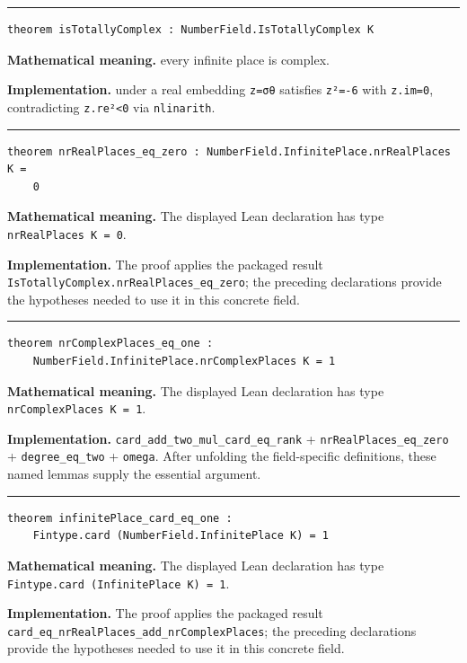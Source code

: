 \documentclass[UTF8,a4paper,11pt,fontset=fandol]{ctexart}
\theoremstyle{definition}
\newcommand{\statementsep}{\par\medskip\hrule\medskip}
\begin{document}
\statementsep
\begin{verbatim}
theorem isTotallyComplex : NumberField.IsTotallyComplex K
\end{verbatim}
\noindent\textbf{Mathematical meaning.} every infinite place is complex.\par
\noindent\textbf{Implementation.} under a real embedding \texttt{z=σθ} satisfies \texttt{z²=-6} with \texttt{z.\allowbreak{}im=0}, contradicting \texttt{z.\allowbreak{}re²<0} via \texttt{nlinarith}.\par
\statementsep
\begin{verbatim}
theorem nrRealPlaces_eq_zero : NumberField.InfinitePlace.nrRealPlaces K =
    0
\end{verbatim}
\noindent\textbf{Mathematical meaning.} The displayed Lean declaration has type \texttt{nrRealPlaces K = 0}.\par
\noindent\textbf{Implementation.} The proof applies the packaged result \texttt{IsTotallyComplex.\allowbreak{}nrRealPlaces\_\allowbreak{}eq\_\allowbreak{}zero}; the preceding declarations provide the hypotheses needed to use it in this concrete field.\par
\statementsep
\begin{verbatim}
theorem nrComplexPlaces_eq_one :
    NumberField.InfinitePlace.nrComplexPlaces K = 1
\end{verbatim}
\noindent\textbf{Mathematical meaning.} The displayed Lean declaration has type \texttt{nrComplexPlaces K = 1}.\par
\noindent\textbf{Implementation.} \texttt{card\_\allowbreak{}add\_\allowbreak{}two\_\allowbreak{}mul\_\allowbreak{}card\_\allowbreak{}eq\_\allowbreak{}rank} + \texttt{nrRealPlaces\_\allowbreak{}eq\_\allowbreak{}zero} + \texttt{degree\_\allowbreak{}eq\_\allowbreak{}two} + \texttt{omega}. After unfolding the field-specific definitions, these named lemmas supply the essential argument.\par
\statementsep
\begin{verbatim}
theorem infinitePlace_card_eq_one :
    Fintype.card (NumberField.InfinitePlace K) = 1
\end{verbatim}
\noindent\textbf{Mathematical meaning.} The displayed Lean declaration has type \texttt{Fintype.\allowbreak{}card (InfinitePlace K) = 1}.\par
\noindent\textbf{Implementation.} The proof applies the packaged result \texttt{card\_\allowbreak{}eq\_\allowbreak{}nrRealPlaces\_\allowbreak{}add\_\allowbreak{}nrComplexPlaces}; the preceding declarations provide the hypotheses needed to use it in this concrete field.\par
\end{document}
